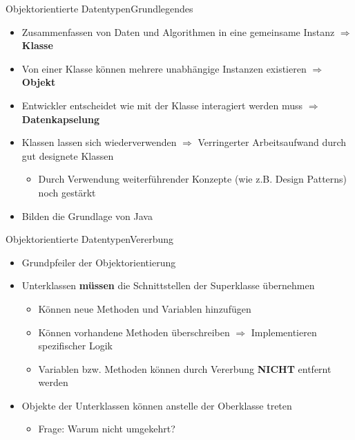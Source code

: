 \begin{frame}{Objektorientierte Datentypen}{Grundlegendes}
    \begin{itemize}
        \item Zusammenfassen von Daten und Algorithmen in eine gemeinsame Instanz $\Rightarrow$ \textbf{Klasse}
        \item Von einer Klasse können mehrere unabhängige Instanzen existieren $\Rightarrow$ \textbf{Objekt}
        \item Entwickler entscheidet wie mit der Klasse interagiert werden muss $\Rightarrow$ \textbf{Datenkapselung}
        \item Klassen lassen sich wiederverwenden $\Rightarrow$ Verringerter Arbeitsaufwand durch gut designete Klassen
        \begin{itemize}
            \item Durch Verwendung weiterführender Konzepte (wie z.B. Design Patterns) noch gestärkt
        \end{itemize}
        \item Bilden die Grundlage von Java
    \end{itemize}
\end{frame}

\begin{frame}{Objektorientierte Datentypen}{Vererbung}
    \begin{itemize}
        \item Grundpfeiler der Objektorientierung
        \item Unterklassen \textbf{müssen} die Schnittstellen der Superklasse übernehmen
        \begin{itemize}
            \item Können neue Methoden und Variablen hinzufügen
            \item Können vorhandene Methoden überschreiben $\Rightarrow$ Implementieren spezifischer Logik
            \item Variablen bzw. Methoden können durch Vererbung \textbf{NICHT} entfernt werden
        \end{itemize}
        \item Objekte der Unterklassen können anstelle der Oberklasse treten
        \begin{itemize}
            \item Frage: Warum nicht umgekehrt?
        \end{itemize}
    \end{itemize}
\end{frame}


